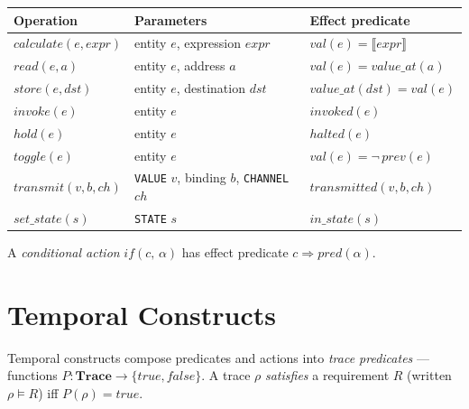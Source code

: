 \documentclass{article}
\begin{document}
\begin{tabularx}{\textwidth}{XXl}
    \toprule
    \textbf{Operation}                     & \textbf{Parameters}                                             & \textbf{Effect predicate}                             \\
    \midrule
    $\mathit{calculate}(e, \mathit{expr})$ & entity $e$, expression $\mathit{expr}$                          & $\mathit{val}(e) = \llbracket\mathit{expr}\rrbracket$ \\
    $\mathit{read}(e, a)$                  & entity $e$, address $a$                                         & $\mathit{val}(e) = \mathit{value\_at}(a)$             \\
    $\mathit{store}(e, \mathit{dst})$      & entity $e$, destination $\mathit{dst}$                          & $\mathit{value\_at}(\mathit{dst}) = \mathit{val}(e)$  \\
    $\mathit{invoke}(e)$                   & entity $e$                                                      & $\mathit{invoked}(e)$                                 \\
    $\mathit{hold}(e)$                     & entity $e$                                                      & $\mathit{halted}(e)$                                  \\
    $\mathit{toggle}(e)$                   & entity $e$                                                      & $\mathit{val}(e) = \lnot\,\mathit{prev}(e)$           \\
    $\mathit{transmit}(v, b, \mathit{ch})$ & \texttt{VALUE} $v$, binding $b$, \texttt{CHANNEL} $\mathit{ch}$ & $\mathit{transmitted}(v, b, \mathit{ch})$             \\
    $\mathit{set\_state}(s)$               & \texttt{STATE} $s$                                              & $\mathit{in\_state}(s)$                               \\
    \bottomrule
\end{tabularx}

\medskip
A \emph{conditional action} $\mathit{if}(c,\, \alpha)$ has effect predicate $c \Rightarrow \mathit{pred}(\alpha)$.

\section{Temporal Constructs}

Temporal constructs compose predicates and actions into \emph{trace predicates} — functions $P : \mathbf{Trace} \to \{\mathit{true}, \mathit{false}\}$. A trace $\rho$ \emph{satisfies} a requirement $R$ (written $\rho \models R$) iff $P(\rho) = \mathit{true}$.
\end{document}
